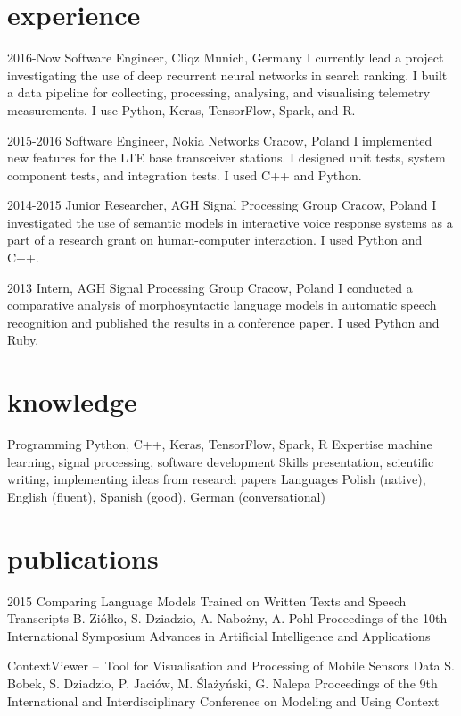 \documentclass[]{friggeri-cv_osx}
\begin{document}
\section{experience}
\begin{entrylist}
\entry
{2016-Now}
{Software Engineer, Cliqz}
{Munich, Germany}
{I currently lead a project investigating the use of deep recurrent neural networks in search ranking. I built a data pipeline for collecting, processing, analysing, and visualising telemetry measurements. I use Python, Keras, TensorFlow, Spark, and R.\\}

\entry
{2015-2016}
{Software Engineer, Nokia Networks}
{Cracow, Poland}
{I implemented new features for the LTE base transceiver stations. I designed unit tests, system component tests, and integration tests. I used C++ and Python.\\}

\entry
{2014-2015}
{Junior Researcher, AGH Signal Processing Group}
{Cracow, Poland}
{I investigated the use of semantic models in interactive voice response systems as a part of a research grant on human-computer interaction. I used Python and C++.\\}

\entry
{2013}
{Intern, AGH Signal Processing Group}
{Cracow, Poland}
{I conducted a comparative analysis of morphosyntactic language models in automatic speech recognition and published the results in a conference paper. I used Python and Ruby.\\}
\end{entrylist}


\section{knowledge}
\begin{entrylist}
\entry
{}
{Programming}
{}
{Python, C++, Keras, TensorFlow, Spark, R}
\entry
{}
{Expertise}
{}
{machine learning, signal processing, software development}
\entry
{}
{Skills}
{}
{presentation, scientific writing, implementing ideas from research papers}
\entry
{}
{Languages}
{}
{Polish (native), English (fluent), Spanish (good), German (conversational)}
\end{entrylist}


\section{publications}
\begin{entrylist}
\entry
{2015}
{Comparing Language Models Trained on Written Texts and Speech Transcripts}
{B. Ziółko, S. Dziadzio, A. Nabożny, A. Pohl}
{Proceedings of the 10th International Symposium Advances in Artificial Intelligence and Applications\\}

\entry
{}
{ContextViewer – Tool for Visualisation and Processing of Mobile Sensors Data}
{S. Bobek, S. Dziadzio, P. Jaciów, M. Ślażyński, G. Nalepa}
{Proceedings of the 9th International and Interdisciplinary Conference on Modeling and Using Context\\\\}
\end{entrylist}
\end{document}

